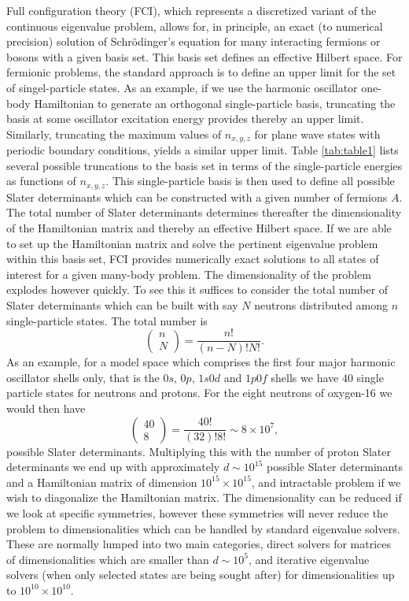   Full configuration theory (FCI), which represents a discretized
  variant of the continuous eigenvalue problem, allows for, in
  principle, an exact (to numerical precision) solution of Schr\"odinger's equation
  for many interacting fermions or bosons with a given basis set. This
  basis set defines an effective Hilbert space.  For fermionic
  problems, the standard approach is to define an upper limit for the
  set of singel-particle states. As an example, if we use the harmonic
  oscillator one-body Hamiltonian to generate an orthogonal
  single-particle basis, truncating the basis at some oscillator
  excitation energy provides thereby an upper limit.  Similarly,
  truncating the maximum values of $n_{x,y,z}$ for plane wave states
  with periodic boundary conditions, yields a similar upper limit.
  Table \ref{tab:table1} lists several possible truncations to the
  basis set in terms of the single-particle energies as functions of
  $n_{x,y,z}$.  This single-particle basis is then used to define all
  possible Slater determinants which can be constructed with a given
  number of fermions $A$.  The total number of Slater determinants
  determines thereafter the dimensionality of the Hamiltonian matrix
  and thereby an effective Hilbert space. 
  If we are able to set up the Hamiltonian matrix
  and solve the pertinent eigenvalue problem within this basis set,
  FCI provides numerically exact solutions to all states of interest
  for a given many-body problem. The dimensionality of the problem
  explodes however quickly. To see this it suffices to consider
  the total number of Slater determinants which can be built with say
  $N$ neutrons distributed among $n$ single-particle states. The total number is
  \[
  \left (\begin{array}{c} n \\ N\end{array} \right)
    =\frac{n!}{(n-N)!N!}.
  \]
  As an example, for a model space which comprises the first four
  major harmonic oscillator shells only, that is the $0s$, $0p$,
  $1s0d$ and $1p0f$ shells we have $40$ single particle states for
  neutrons and protons.  For the eight neutrons of oxygen-16 we would
  then have
  \[
  \left (\begin{array}{c} 40 \\ 8\end{array} \right)
    =\frac{40!}{(32)!8!}\sim 8\times 10^{7},
  \]
  possible Slater determinants. Multiplying this with the number of
  proton Slater determinants we end up with approximately $d\sim 10^{15}$ 
  possible Slater determinants and a Hamiltonian matrix of
  dimension $10^{15}\times 10^{15}$, and intractable problem if we wish to diagonalize the Hamiltonian matrix. The
  dimensionality can be reduced if we look at specific symmetries,
  however these symmetries will never reduce the problem to
  dimensionalities which can be handled by standard eigenvalue
  solvers. These are normally lumped into two main categories, direct
  solvers for matrices of dimensionalities which are smaller than
  $d\sim 10^5$, and iterative eigenvalue solvers (when only selected
  states are being sought after) for dimensionalities up to
  $10^{10}\times 10^{10}$.


